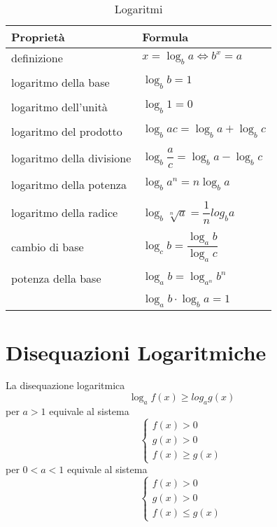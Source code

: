 \begin{table}
\centering
\begin{tabular}{ll}
\toprule
Proprietà&Formula\\
\midrule
definizione&$x=\log_ba\Leftrightarrow b^{x}=a$\\
&\\
logaritmo della base&$\log_bb=1$\\
&\\
logaritmo dell'unità&$\log_b1=0$\\
&\\
logaritmo del prodotto&$\log_bac=\log_ba+\log_bc$\\
&\\
logaritmo della divisione&$\log_b\dfrac{a}{c}=\log_ba-\log_bc$\\
&\\
logaritmo della potenza&$\log_ba^{n}=n\log_ba$\\
&\\
logaritmo della radice&$\log_b\sqrt[n]{a}=\dfrac{1}{n}log_ba$\\
&\\
cambio di base&$\log_cb=\dfrac{\log_ab}{\log_ac}$\\
&\\
potenza della base&$\log_ab=\log_{a^n}b^{n}$\\
&\\
&$\log_ab\cdot\log_ba=1$\\
\bottomrule
\end{tabular}
\caption{Logaritmi}
\label{tab:logaritmi}
\end{table}
\section{Disequazioni Logaritmiche}
\label{sec:DisequazioniLogaritmiche}
La disequazione logaritmica 
\[\log_{a}f(x) \geq log_{a}g(x)\]
per $a>1$ equivale al sistema
\[\begin{cases}
f(x)>0\\ 
g(x)>0\\ 
f(x)\geq g(x)
\end{cases}\]
per $0<a<1$ equivale al sistema
\[\begin{cases}
f(x)>0\\ 
g(x)>0\\ 
f(x)\leq g(x)
\end{cases}\]
